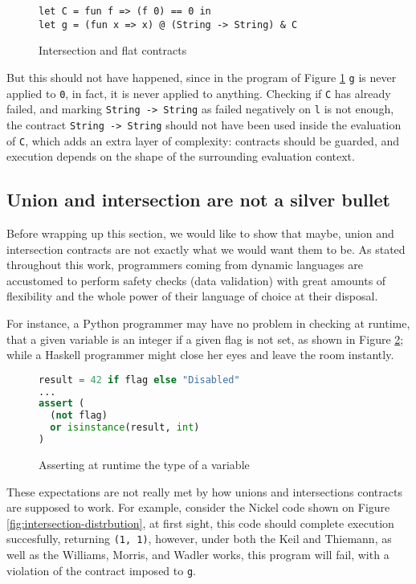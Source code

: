 \documentclass[sigplan,10pt,review,anonymous]{acmart}
\newcommand{\nickel}[1]{\lstinline[language=nickel]{#1}}
\begin{document}
\begin{figure}[h]
\begin{lstlisting}[language=nickel]
let C = fun f => (f 0) == 0 in
let g = (fun x => x) @ (String -> String) & C
\end{lstlisting}
\caption{Intersection and flat contracts}
\label{fig:inter-flat-contracts}
\end{figure}

But this should not have happened, since in the program of Figure \ref{fig:inter-flat-contracts}
\nickel{g} is never applied to \nickel{0}, in fact, it is never applied
to anything.
Checking if \nickel{C} has already failed, and marking \nickel{String -> String} as
failed negatively on \nickel{l} is not enough, the contract \nickel{String -> String}
should not have been used inside the evaluation of \nickel{C}, which
adds an extra layer of complexity: contracts should be guarded, and execution
depends on the shape of the surrounding evaluation context.

\subsection*{Union and intersection are not a silver bullet}

Before wrapping up this section, we would like to show that maybe, union and intersection
contracts are not exactly what we would want them to be.
As stated throughout this work, programmers coming from dynamic languages
are accustomed to perform safety checks (data validation) with
great amounts of flexibility and the whole power of their
language of choice at their disposal.

For instance, a Python programmer may have no problem in checking
at runtime, that a given variable is an integer if a given flag is
not set, as shown in Figure \ref{fig:python-assertion};
while a Haskell programmer might close her eyes and leave the room
instantly.

\begin{figure}[h]
\begin{lstlisting}[language=python]
result = 42 if flag else "Disabled"
...
assert (
  (not flag) 
  or isinstance(result, int)
)
\end{lstlisting}
\caption{Asserting at runtime the type of a variable}
\label{fig:python-assertion}
\end{figure}

These expectations are not really met by how unions and intersections
contracts are supposed to work.
For example, consider the Nickel code shown on Figure
\ref{fig:intersection-distrbution}, at first sight, this code should
complete execution succesfully, returning \nickel{(1, 1)},
however, under both the Keil and Thiemann, as well as the
Williams, Morris, and Wadler works, this program will fail, with a violation
of the contract imposed to \nickel{g}.
\end{document}
